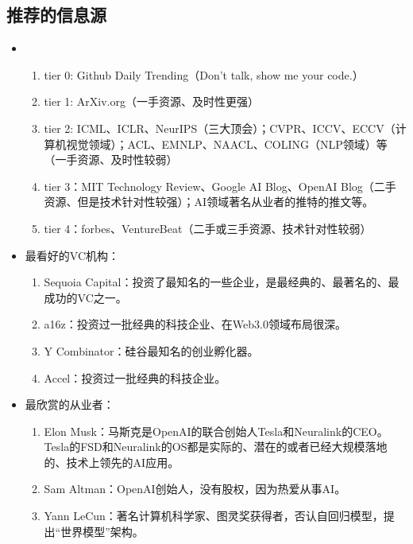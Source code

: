 \subsection{推荐的信息源}
\begin{itemize}
    \item 
    \begin{enumerate}
        \item tier 0: Github Daily Trending（Don't talk, show me your code.）
        \item tier 1: ArXiv.org（一手资源、及时性更强）
        \item tier 2: ICML、ICLR、NeurIPS（三大顶会）；CVPR、ICCV、ECCV（计算机视觉领域）；ACL、EMNLP、NAACL、COLING（NLP领域）等（一手资源、及时性较弱）
        \item tier 3：MIT Technology Review、Google AI Blog、OpenAI Blog（二手资源、但是技术针对性较强）；AI领域著名从业者的推特的推文等。
        \item tier 4：forbes、VentureBeat（二手或三手资源、技术针对性较弱）
        
    \end{enumerate}
    
    \item 最看好的VC机构：
    \begin{enumerate}
        \item Sequoia Capital：投资了最知名的一些企业，是最经典的、最著名的、最成功的VC之一。
        \item a16z：投资过一批经典的科技企业、在Web3.0领域布局很深。
        \item Y Combinator：硅谷最知名的创业孵化器。
        \item Accel：投资过一批经典的科技企业。
    \end{enumerate}
    \item 最欣赏的从业者：
    \begin{enumerate}
        \item Elon Musk：马斯克是OpenAI的联合创始人Tesla和Neuralink的CEO。Tesla的FSD和Neuralink的OS都是实际的、潜在的或者已经大规模落地的、技术上领先的AI应用。
        \item Sam Altman：OpenAI创始人，没有股权，因为热爱从事AI。
        \item Yann LeCun：著名计算机科学家、图灵奖获得者，否认自回归模型，提出“世界模型”架构。
        \end{enumerate}
\end{itemize}